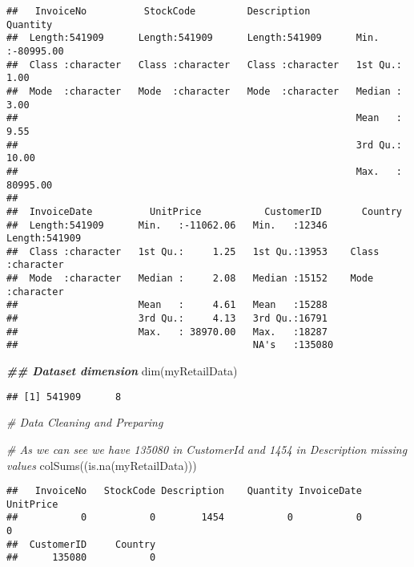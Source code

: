 \documentclass[
]{article}
\newenvironment{Shaded}{\begin{snugshade}}{\end{snugshade}}
\newcommand{\CommentTok}[1]{\textcolor[rgb]{0.56,0.35,0.01}{\textit{#1}}}
\newcommand{\DocumentationTok}[1]{\textcolor[rgb]{0.56,0.35,0.01}{\textbf{\textit{#1}}}}
\newcommand{\FunctionTok}[1]{\textcolor[rgb]{0.00,0.00,0.00}{#1}}
\newcommand{\NormalTok}[1]{#1}
\begin{document}
\begin{verbatim}
##   InvoiceNo          StockCode         Description           Quantity        
##  Length:541909      Length:541909      Length:541909      Min.   :-80995.00  
##  Class :character   Class :character   Class :character   1st Qu.:     1.00  
##  Mode  :character   Mode  :character   Mode  :character   Median :     3.00  
##                                                           Mean   :     9.55  
##                                                           3rd Qu.:    10.00  
##                                                           Max.   : 80995.00  
##                                                                              
##  InvoiceDate          UnitPrice           CustomerID       Country         
##  Length:541909      Min.   :-11062.06   Min.   :12346    Length:541909     
##  Class :character   1st Qu.:     1.25   1st Qu.:13953    Class :character  
##  Mode  :character   Median :     2.08   Median :15152    Mode  :character  
##                     Mean   :     4.61   Mean   :15288                      
##                     3rd Qu.:     4.13   3rd Qu.:16791                      
##                     Max.   : 38970.00   Max.   :18287                      
##                                         NA's   :135080
\end{verbatim}

\begin{Shaded}
\begin{Highlighting}[]
\DocumentationTok{\#\# Dataset dimension }
\FunctionTok{dim}\NormalTok{(myRetailData)}
\end{Highlighting}
\end{Shaded}

\begin{verbatim}
## [1] 541909      8
\end{verbatim}

\begin{Shaded}
\begin{Highlighting}[]
\CommentTok{\# Data Cleaning and Preparing}

\CommentTok{\# As we can see we have 135080 in CustomerId and 1454 in Description missing values }
\FunctionTok{colSums}\NormalTok{((}\FunctionTok{is.na}\NormalTok{(myRetailData)))}
\end{Highlighting}
\end{Shaded}

\begin{verbatim}
##   InvoiceNo   StockCode Description    Quantity InvoiceDate   UnitPrice 
##           0           0        1454           0           0           0 
##  CustomerID     Country 
##      135080           0
\end{verbatim}
\end{document}

